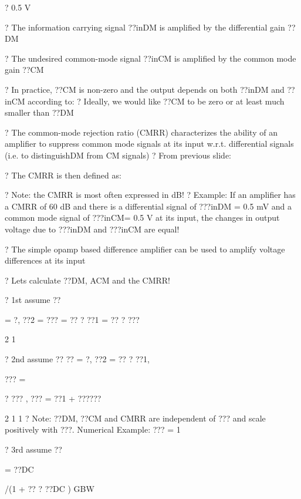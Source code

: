 \documentclass[2pt,landscape]{article}
\begin{document}
\begin{multicols*}{5}
? 0.5 V



?	The information carrying signal ??inDM is 
amplified by the differential gain ??DM

?	The undesired common-mode signal
??inCM is amplified by the common 
mode gain ??CM


?	In practice, ??CM is non-zero and the output depends on both ??inDM and
??inCM according to:
?	Ideally, we would like ??CM to be zero or at least much smaller than ??DM



?	The common-mode rejection ratio (CMRR) characterizes the ability of 
an amplifier to suppress common mode signals at its input w.r.t. 
differential signals (i.e. to \textbullet distinguish\textbullet DM from CM signals)
?	From previous slide:

?	The CMRR is then defined as:

?	Note: the CMRR is most often expressed in dB!
?	Example: If an amplifier has a CMRR of 60 dB and there is a 
differential signal of ???inDM = 0.5 mV and a common mode signal of 
???inCM= 0.5 V at its input, the changes in output voltage due to ???inDM 
and ???inCM are equal!



?	The simple opamp based difference amplifier can be used to amplify 
voltage differences at its input











?	Let\textbullet s calculate ??DM, ACM and the CMRR!





?	1st assume ??


= ?, ??2 = ??? = 
?? ? ??1 = ?? ? ???


2	1


?	2nd assume ?? ??	= ?, ??2 = ?? ? ??1,


??? =


? ??? , 
??? = 
??1 + 
??????


2	1	1
?	Note: ??DM, ??CM and CMRR are independent of ??? and scale positively 
with ???. Numerical Example: ??? = 1 %






?	3rd assume ??


= ??DC


/(1 + ?? ? ??DC )
GBW





\end{multicols*}
\end{document}
